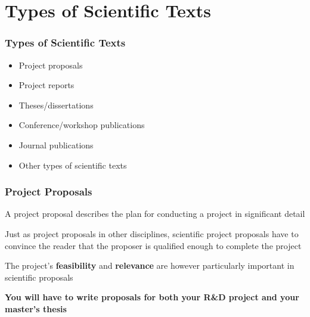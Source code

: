 \documentclass{beamer}
\begin{document}
\section{Types of Scientific Texts}

\begin{frame}
\frametitle{Types of Scientific Texts}
    \begin{itemize}
        \item Project proposals
        \item Project reports
        \item Theses/dissertations
        \item Conference/workshop publications
        \item Journal publications
        \item Other types of scientific texts
    \end{itemize}
\end{frame}

\begin{frame}
\frametitle{Project Proposals}
    \vspace{-1cm}
    A project proposal describes the plan for conducting a project in significant detail
    \newline

    Just as project proposals in other disciplines, scientific project proposals have to convince the reader that the proposer is qualified enough to complete the project
    \newline

    The project's \textbf{feasibility} and \textbf{relevance} are however particularly important in scientific proposals
    \newline

    \textbf{You will have to write proposals for both your R\&D project and your master's thesis}
\end{frame}
\end{document}
